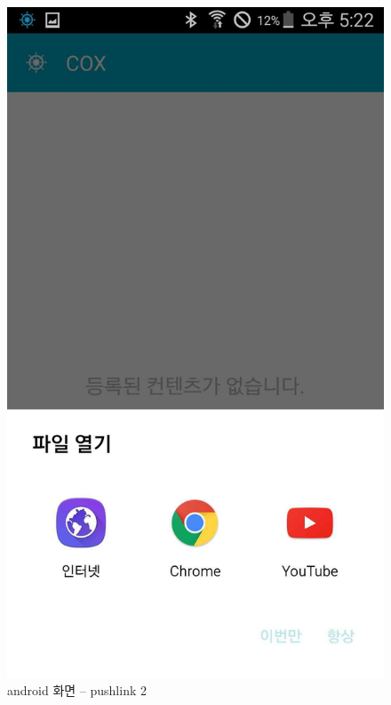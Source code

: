 \documentclass[chapter,oneside]{oblivoir}
\begin{document}
\begin{enumerate}
    \begin{figure}[h!]
    \centering
    \includegraphics{pic/chp7/img1014}
    \caption{android 화면 – pushlink 2}
    \end{figure}


\end{enumerate}
\end{document}
